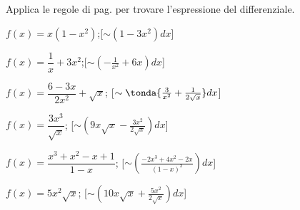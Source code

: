 \begin{esercizio}\label{ese:dif07}
Applica le regole di pag.\pageref{subsubsec:diff01_diffsint} per trovare 
l'espressione del differenziale.
 \begin{enumeratea}
  \item $f(x)=x(1-x^2)$;\hfill [$\sim (1-3x^2)dx$]
  \item $f(x)=\dfrac{1}{x}+ 3x^2$;\hfill [$\sim (-\frac{1}{x^2}+6x)dx$]
  \item $f(x)=\dfrac{6-3x}{2x^2}+\sqrt{x}$;\hfill 
  [$\sim \tonda{\frac{3}{x^2}+\frac{1}{2\sqrt{x}}}dx$]
  \item $f(x)=\dfrac{3x^3}{\sqrt{x}}$;\hfill 
  [$\sim (9x\sqrt{x}-\frac{3x^2}{2\sqrt{x}})dx$]
  \item $f(x)=\dfrac{x^3+x^2-x+1}{1-x}$;\hfill 
  [$\sim (\frac{-2x^3+4x^2-2x}{(1-x)^2})dx$]
  \item $f(x)=5x^2\sqrt{x}$;\hfill 
  [$\sim (10x\sqrt{x}+\frac{5x^2}{2\sqrt{x}})dx$]
 \end{enumeratea}
\end{esercizio} 


